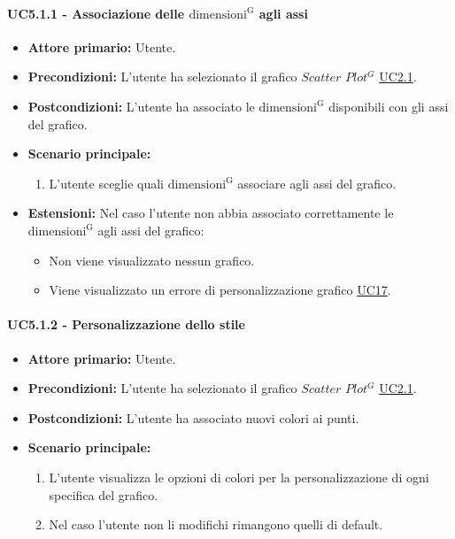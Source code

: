 \paragraph{UC5.1.1 - Associazione delle ${\mathrm{dimensioni^{G}}}$ agli assi}
\label{sec:UC5.1.1}
    \begin{itemize}
        \item \textbf{Attore primario:} Utente.
        \item \textbf{Precondizioni:} L'utente ha selezionato il grafico $Scatter$ $Plot^{G}$ \hyperref[sec:UC2.1]{UC2.1}.
	    \item \textbf{Postcondizioni:} L'utente ha associato le ${\mathrm{dimensioni^{G}}}$ disponibili con gli assi del grafico.
	    \item \textbf{Scenario principale:} 
	    \begin{enumerate}
	    		\item L'utente sceglie quali ${\mathrm{dimensioni^{G}}}$ associare agli assi del grafico.
		\end{enumerate}
	    \item \textbf{Estensioni:} Nel caso l'utente non abbia associato correttamente le ${\mathrm{dimensioni^{G}}}$ agli assi del grafico:
              \begin{itemize}
                  \item Non viene visualizzato nessun grafico.
                  \item Viene visualizzato un errore di personalizzazione grafico \hyperref[sec:UC17 - Errore di personalizzazione]{UC17}.
              \end{itemize}
    \end{itemize}
\paragraph{UC5.1.2 - Personalizzazione dello stile}
\label{sec:UC5.1.2}
    \begin{itemize}
        \item \textbf{Attore primario:} Utente.
        \item \textbf{Precondizioni:} L'utente ha selezionato il grafico $Scatter$ $Plot^{G}$ \hyperref[sec:UC2.1]{UC2.1}.
	    \item \textbf{Postcondizioni:} L'utente ha associato nuovi colori ai punti.
	    \item \textbf{Scenario principale:} 
	    \begin{enumerate}
	    		\item L'utente visualizza le opzioni di colori per la personalizzazione di ogni specifica del grafico.
	    		\item Nel caso l'utente non li modifichi rimangono quelli di default.
		\end{enumerate}
    \end{itemize}

